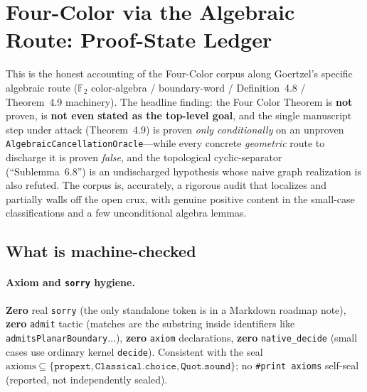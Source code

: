 %

\section{Four-Color via the Algebraic Route: Proof-State Ledger}
\label{sec:fourcolor-proofstate}

This is the honest accounting of the Four-Color corpus along Goertzel's specific
algebraic route ($\mathbb{F}_2$ color-algebra / boundary-word / Definition~4.8 /
Theorem~4.9 machinery). The headline finding: the Four Color Theorem is
\textbf{not} proven, is \textbf{not even stated as the top-level goal}, and the
single manuscript step under attack (Theorem~4.9) is proven \emph{only
conditionally} on an unproven \texttt{AlgebraicCancellationOracle}---while every
concrete \emph{geometric} route to discharge it is proven \emph{false}, and the
topological cyclic-separator (``Sublemma~6.8'') is an undischarged hypothesis
whose naive graph realization is also refuted. The corpus is, accurately, a
rigorous audit that localizes and partially walls off the open crux, with genuine
positive content in the small-case classifications and a few unconditional
algebra lemmas.

\subsection{What is machine-checked}
\label{sec:fc-checked}

\paragraph{Axiom and \texttt{sorry} hygiene.}
\textbf{Zero} real \texttt{sorry} (the only standalone token is in a Markdown
roadmap note), \textbf{zero} \texttt{admit} tactic (matches are the substring
inside identifiers like \texttt{admitsPlanarBoundary}$\dots$), \textbf{zero}
\texttt{axiom} declarations, \textbf{zero} \texttt{native\_decide} (small cases
use ordinary kernel \texttt{decide}). Consistent with the seal
$\text{axioms}\subseteq\{\texttt{propext},\texttt{Classical.choice},
\texttt{Quot.sound}\}$; no \texttt{\#print axioms} self-seal (reported, not
independently sealed).

